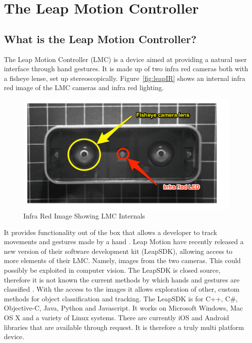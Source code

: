 \documentclass[11pt,oneside]{report}
\begin{document}
		\section{The Leap Motion Controller}
			\subsection{What is the Leap Motion Controller?}
				The Leap Motion Controller (LMC) is a device aimed at providing a natural user interface through hand gestures.
				It is made up of two infra red cameras both with a fisheye lense, set up stereoscopically.
				Figure~\ref{fig:leapIR} shows an internal infra red image of the LMC cameras and infra red lighting.
				\begin{figure}[!ht]
				\centering
					\includegraphics[width=\textwidth]{leap_ir.pdf}
					\caption{Infra Red Image Showing LMC Internals\protect {\label{fig:leapIR}}}
				\end{figure}
				It provides functionality out of the box that allows a developer to track movements and gestures made by a hand \cite{web:leapGestures}.
				Leap Motion have recently released a new version of their software development kit (LeapSDK), allowing access to more elements of their LMC. 
				Namely, images from the two cameras. 
				This could possibly be exploited in computer vision. %
				The LeapSDK is closed source, therefore it is not known the current methods by which hands and gestures are classified \cite[p. 217]{journal:leapEvaluation}.
				With the access to the images it allows exploration of other, custom methods for object classification and tracking.
				The LeapSDK is for C++, C\#, Objective-C, Java, Python and Javascript.
				It works on Microsoft Windows, Mac OS X and a variety of Linux systems.
				There are currently iOS and Android libraries that are available through request.
				It is therefore a truly multi platform device.
				
\end{document}
